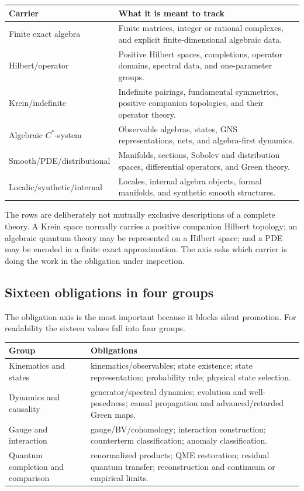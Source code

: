 \documentclass[11pt]{article}
\theoremstyle{definition}
\theoremstyle{remark}
\begin{document}
\begin{center}
\small
\begin{tabularx}{\textwidth}{@{}Z Y@{}}
\toprule
Carrier & What it is meant to track \\
\midrule
Finite exact algebra & Finite matrices, integer or rational complexes, and
explicit finite-dimensional algebraic data. \\
Hilbert/operator & Positive Hilbert spaces, completions, operator domains,
spectral data, and one-parameter groups. \\
Krein/indefinite & Indefinite pairings, fundamental symmetries, positive
companion topologies, and their operator theory. \\
Algebraic \(C^*\)-system & Observable algebras, states, GNS representations,
nets, and algebra-first dynamics. \\
Smooth/PDE/\linebreak distributional & Manifolds, sections, Sobolev and distribution
spaces, differential operators, and Green theory. \\
Localic/synthetic/\linebreak internal & Locales, internal algebra objects, formal
manifolds, and synthetic smooth structures. \\
\bottomrule
\end{tabularx}
\end{center}

The rows are deliberately not mutually exclusive descriptions of a complete
theory.  A Krein space normally carries a positive companion Hilbert topology;
an algebraic quantum theory may be represented on a Hilbert space; and a PDE
may be encoded in a finite exact approximation.  The axis asks which carrier
is doing the work in the obligation under inspection.

\subsection{Sixteen obligations in four groups}

The obligation axis is the most important because it blocks silent promotion.
For readability the sixteen values fall into four groups.

\begin{center}
\small
\begin{tabularx}{\textwidth}{@{}Z Y@{}}
\toprule
Group & Obligations \\
\midrule
Kinematics and states & kinematics/observables; state existence; state
representation; probability rule; physical state selection. \\
Dynamics and causality & generator/spectral dynamics; evolution and
well-posedness; causal propagation and advanced/retarded Green maps. \\
Gauge and interaction & gauge/BV/cohomology; interaction construction;
counterterm classification; anomaly classification. \\
Quantum completion and comparison & renormalized products; QME restoration;
residual quantum transfer; reconstruction and continuum or empirical limits. \\
\bottomrule
\end{tabularx}
\end{center}
\end{document}
